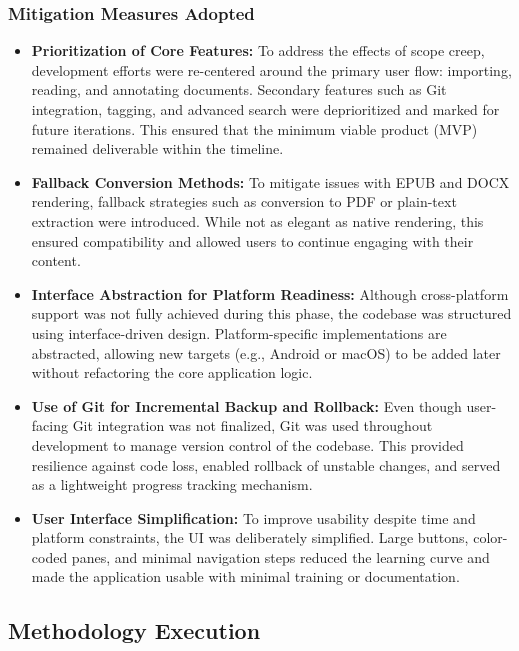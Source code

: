 \subsubsection{Mitigation Measures Adopted}
\begin{itemize}
    \item \textbf{Prioritization of Core Features:}  
    To address the effects of scope creep, development efforts were re-centered around the primary user flow: importing, reading, and annotating documents. Secondary features such as Git integration, tagging, and advanced search were deprioritized and marked for future iterations. This ensured that the minimum viable product (MVP) remained deliverable within the timeline.
    
    \item \textbf{Fallback Conversion Methods:}  
    To mitigate issues with EPUB and DOCX rendering, fallback strategies such as conversion to PDF or plain-text extraction were introduced. While not as elegant as native rendering, this ensured compatibility and allowed users to continue engaging with their content.


    \item \textbf{Interface Abstraction for Platform Readiness:}  
    Although cross-platform support was not fully achieved during this phase, the codebase was structured using interface-driven design. Platform-specific implementations are abstracted, allowing new targets (e.g., Android or macOS) to be added later without refactoring the core application logic.
    
    \item \textbf{Use of Git for Incremental Backup and Rollback:}  
    Even though user-facing Git integration was not finalized, Git was used throughout development to manage version control of the codebase. This provided resilience against code loss, enabled rollback of unstable changes, and served as a lightweight progress tracking mechanism.

    \item \textbf{User Interface Simplification:}  
    To improve usability despite time and platform constraints, the UI was deliberately simplified. Large buttons, color-coded panes, and minimal navigation steps reduced the learning curve and made the application usable with minimal training or documentation.


\end{itemize}

\subsection{Methodology Execution}
